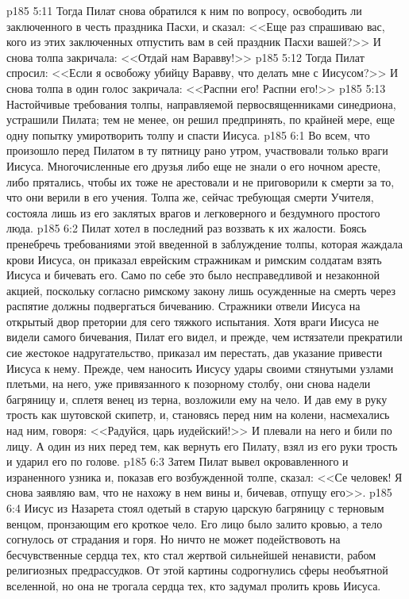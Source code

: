 \vs p185 5:11 Тогда Пилат снова обратился к ним по вопросу, освободить ли заключенного в честь праздника Пасхи, и сказал: <<Еще раз спрашиваю вас, кого из этих заключенных отпустить вам в сей праздник Пасхи вашей?>> И снова толпа закричала: <<Отдай нам Варавву!>>
\vs p185 5:12 Тогда Пилат спросил: <<Если я освобожу убийцу Варавву, что делать мне с Иисусом?>> И снова толпа в один голос закричала: <<Распни его! Распни его!>>
\vs p185 5:13 Настойчивые требования толпы, направляемой первосвященниками синедриона, устрашили Пилата; тем не менее, он решил предпринять, по крайней мере, еще одну попытку умиротворить толпу и спасти Иисуса.
\vs p185 6:1 Во всем, что произошло перед Пилатом в ту пятницу рано утром, участвовали только враги Иисуса. Многочисленные его друзья либо еще не знали о его ночном аресте, либо прятались, чтобы их тоже не арестовали и не приговорили к смерти за то, что они верили в его учения. Толпа же, сейчас требующая смерти Учителя, состояла лишь из его заклятых врагов и легковерного и бездумного простого люда.
\vs p185 6:2 Пилат хотел в последний раз воззвать к их жалости. Боясь пренебречь требованиями этой введенной в заблуждение толпы, которая жаждала крови Иисуса, он приказал еврейским стражникам и римским солдатам взять Иисуса и бичевать его. Само по себе это было несправедливой и незаконной акцией, поскольку согласно римскому закону лишь осужденные на смерть через распятие должны подвергаться бичеванию. Стражники отвели Иисуса на открытый двор претории для сего тяжкого испытания. Хотя враги Иисуса не видели самого бичевания, Пилат его видел, и прежде, чем истязатели прекратили сие жестокое надругательство, приказал им перестать, дав указание привести Иисуса к нему. Прежде, чем наносить Иисусу удары своими стянутыми узлами плетьми, на него, уже привязанного к позорному столбу, они снова надели багряницу и, сплетя венец из терна, возложили ему на чело. И дав ему в руку трость как шутовской скипетр, и, становясь перед ним на колени, насмехались над ним, говоря: <<Радуйся, царь иудейский!>> И плевали на него и били по лицу. А один из них перед тем, как вернуть его Пилату, взял из его руки трость и ударил его по голове.
\vs p185 6:3 Затем Пилат вывел окровавленного и израненного узника и, показав его возбужденной толпе, сказал: <<Се человек! Я снова заявляю вам, что не нахожу в нем вины и, бичевав, отпущу его>>.
\vs p185 6:4 Иисус из Назарета стоял одетый в старую царскую багряницу с терновым венцом, пронзающим его кроткое чело. Его лицо было залито кровью, а тело согнулось от страдания и горя. Но ничто не может подействовоть на бесчувственные сердца тех, кто стал жертвой сильнейшей ненависти, рабом религиозных предрассудков. От этой картины содрогнулись сферы необъятной вселенной, но она не трогала сердца тех, кто задумал пролить кровь Иисуса.
